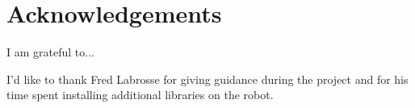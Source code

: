 \thispagestyle{empty}


\section*{\centering Acknowledgements}

I am grateful to...

I'd like to thank Fred Labrosse for giving guidance during the project and for his time spent installing additional libraries on the robot.

